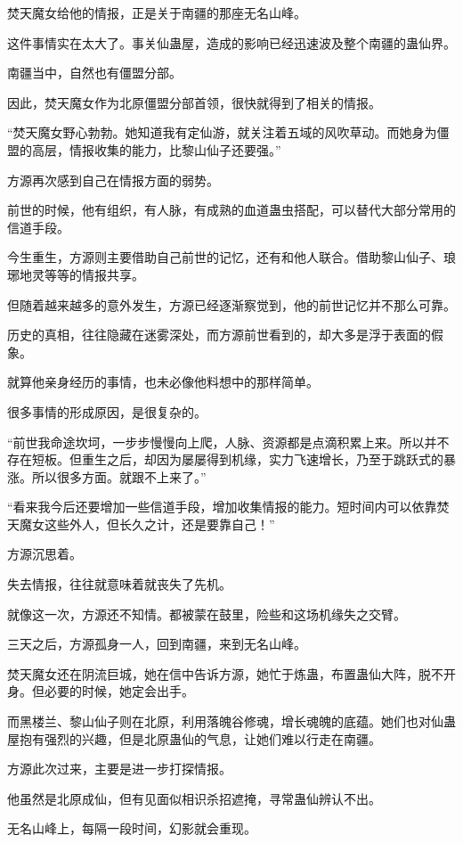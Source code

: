 \begin{this_body}
焚天魔女给他的情报，正是关于南疆的那座无名山峰。

这件事情实在太大了。事关仙蛊屋，造成的影响已经迅速波及整个南疆的蛊仙界。

南疆当中，自然也有僵盟分部。

因此，焚天魔女作为北原僵盟分部首领，很快就得到了相关的情报。

“焚天魔女野心勃勃。她知道我有定仙游，就关注着五域的风吹草动。而她身为僵盟的高层，情报收集的能力，比黎山仙子还要强。”

方源再次感到自己在情报方面的弱势。

前世的时候，他有组织，有人脉，有成熟的血道蛊虫搭配，可以替代大部分常用的信道手段。

今生重生，方源则主要借助自己前世的记忆，还有和他人联合。借助黎山仙子、琅琊地灵等等的情报共享。

但随着越来越多的意外发生，方源已经逐渐察觉到，他的前世记忆并不那么可靠。

历史的真相，往往隐藏在迷雾深处，而方源前世看到的，却大多是浮于表面的假象。

就算他亲身经历的事情，也未必像他料想中的那样简单。

很多事情的形成原因，是很复杂的。

“前世我命途坎坷，一步步慢慢向上爬，人脉、资源都是点滴积累上来。所以并不存在短板。但重生之后，却因为屡屡得到机缘，实力飞速增长，乃至于跳跃式的暴涨。所以很多方面。就跟不上来了。”

“看来我今后还要增加一些信道手段，增加收集情报的能力。短时间内可以依靠焚天魔女这些外人，但长久之计，还是要靠自己！”

方源沉思着。

失去情报，往往就意味着就丧失了先机。

就像这一次，方源还不知情。都被蒙在鼓里，险些和这场机缘失之交臂。

三天之后，方源孤身一人，回到南疆，来到无名山峰。

焚天魔女还在阴流巨城，她在信中告诉方源，她忙于炼蛊，布置蛊仙大阵，脱不开身。但必要的时候，她定会出手。

而黑楼兰、黎山仙子则在北原，利用落魄谷修魂，增长魂魄的底蕴。她们也对仙蛊屋抱有强烈的兴趣，但是北原蛊仙的气息，让她们难以行走在南疆。

方源此次过来，主要是进一步打探情报。

他虽然是北原成仙，但有见面似相识杀招遮掩，寻常蛊仙辨认不出。

无名山峰上，每隔一段时间，幻影就会重现。


\end{this_body}
